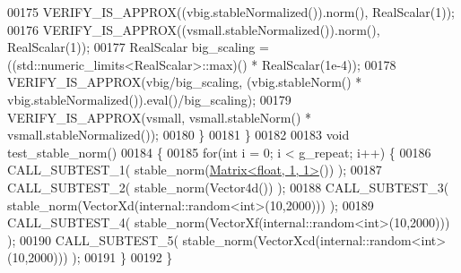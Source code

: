 \begin{DoxyCode}
00175     VERIFY\_IS\_APPROX((vbig.stableNormalized()).norm(), RealScalar(1));
00176     VERIFY\_IS\_APPROX((vsmall.stableNormalized()).norm(), RealScalar(1));
00177     RealScalar big\_scaling = ((std::numeric\_limits<RealScalar>::max)() * RealScalar(1e-4));
00178     VERIFY\_IS\_APPROX(vbig/big\_scaling, (vbig.stableNorm() * vbig.stableNormalized()).eval()/big\_scaling);
00179     VERIFY\_IS\_APPROX(vsmall, vsmall.stableNorm() * vsmall.stableNormalized());
00180   \}
00181 \}
00182 
00183 \textcolor{keywordtype}{void} test\_stable\_norm()
00184 \{
00185   \textcolor{keywordflow}{for}(\textcolor{keywordtype}{int} i = 0; i < g\_repeat; i++) \{
00186     CALL\_SUBTEST\_1( stable\_norm(\hyperlink{group___core___module_class_eigen_1_1_matrix}{Matrix<float, 1, 1>}()) );
00187     CALL\_SUBTEST\_2( stable\_norm(Vector4d()) );
00188     CALL\_SUBTEST\_3( stable\_norm(VectorXd(internal::random<int>(10,2000))) );
00189     CALL\_SUBTEST\_4( stable\_norm(VectorXf(internal::random<int>(10,2000))) );
00190     CALL\_SUBTEST\_5( stable\_norm(VectorXcd(internal::random<int>(10,2000))) );
00191   \}
00192 \}
\end{DoxyCode}
